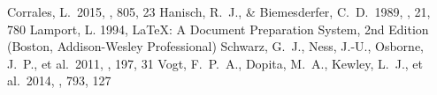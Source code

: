 \documentclass{aastex6}
\newcommand\aastex{AAS\TeX}
\begin{document}


\begin{thebibliography}{}

 Corrales, L.\ 2015, \apj, 805, 23
 Hanisch, R.~J., \& Biemesderfer, C.~D.\ 1989, \baas, 21, 780
 Lamport, L. 1994, LaTeX: A Document Preparation System, 2nd Edition (Boston, Addison-Wesley Professional)
 Schwarz, G.~J., Ness, J.-U., Osborne, J.~P., et al.\ 2011, \apjs, 197, 31
 Vogt, F.~P.~A., Dopita, M.~A., Kewley, L.~J., et al.\ 2014, \apj, 793, 127

\end{thebibliography}

\allauthors

\listofchanges
\end{document}
